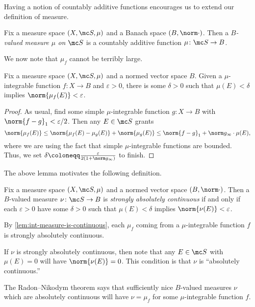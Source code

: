 \documentclass[../notes.tex]{subfiles}
\begin{document}
Having a notion of countably additive functions encourages us to extend our definition of measure.
\begin{definition}[Measure]
	Fix a measure space $(X,\mc S,\mu)$ and a Banach space $(B,\norm\cdot)$. Then a \textit{$B$-valued measure $\mu$ on $\mc S$} is a countably additive function $\mu\colon\mc S\to B$.
\end{definition}
We now note that $\mu_f$ cannot be terribly large.
\begin{lemma} \label{lem:int-measure-is-continuous}
	Fix a measure space $(X,\mc S,\mu)$ and a normed vector space $B$. Given a $\mu$-integrable function $f\colon X\to B$ and $\varepsilon>0$, there is some $\delta>0$ such that $\mu(E)<\delta$ implies $\norm{\mu_f(E)}<\varepsilon$.
\end{lemma}
\begin{proof}
	As usual, find some simple $\mu$-integrable function $g\colon X\to B$ with $\norm{f-g}_1<\varepsilon/2$. Then any $E\in\mc S$ grants
	\[\norm{\mu_f(E)}\le\norm{\mu_f(E)-\mu_g(E)}+\norm{\mu_g(E)}\le\norm{f-g}_1+\norm g_\infty\cdot\mu(E),\]
	where we are using the fact that simple $\mu$-integrable functions are bounded. Thus, we set $\delta\coloneqq\frac\varepsilon{2(1+\norm g_\infty)}$ to finish.
\end{proof}
The above lemma motivates the following definition.
\begin{definition}
	Fix a measure space $(X,\mc S,\mu)$ and a normed vector space $(B,\norm\cdot)$. Then a $B$-valued measure $\nu\colon\mc S\to B$ is \textit{strongly absolutely continuous} if and only if each $\varepsilon>0$ have some $\delta>0$ such that $\mu(E)<\delta$ implies $\norm{\nu(E)}<\varepsilon$.
\end{definition}
\begin{example}
	By \autoref{lem:int-measure-is-continuous}, each $\mu_f$ coming from a $\mu$-integrable function $f$ is strongly absolutely continuous.
\end{example}
\begin{remark}
	If $\nu$ is strongly absolutely continuous, then note that any $E\in\mc S$ with $\mu(E)=0$ will have $\norm{\nu(E)}=0$. This condition is that $\nu$ is ``absolutely continuous.''
\end{remark}
\begin{remark}
	The Radon--Nikodym theorem says that sufficiently nice $B$-valued measures $\nu$ which are absolutely continuous will have $\nu=\mu_f$ for some $\mu$-integrable function $f$.
\end{remark}
\end{document}
